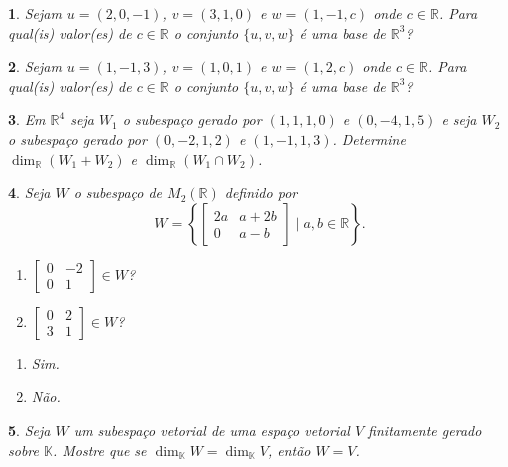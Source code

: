 \documentclass[12pt]{exam}
\newtheorem{exercicio}{}
\newcommand{\real}{\mathbb{R}}
\newcommand{\cp}[1]{\mathbb{#1}}
\begin{document}
\begin{exercicio}
  Sejam $u = (2, 0 , -1)$, $v = (3, 1 , 0)$ e $w = (1, -1 , c)$ onde $c \in \real$. Para qual(is) valor(es) de $c \in \real$ o conjunto $\{u, v, w\}$ \'e uma base de $\real^3$?
\end{exercicio}

\begin{exercicio}
  Sejam $u = (1, -1 , 3)$, $v = (1, 0 , 1)$ e $w = (1, 2 , c)$ onde $c \in \real$. Para qual(is) valor(es) de $c \in \real$ o conjunto $\{u, v, w\}$ \'e uma base de $\real^3$?
\end{exercicio}

\begin{exercicio}
  Em $\real^4$ seja $W_1$ o subespa\c{c}o gerado por $(1,1,1,0)$ e $(0,-4,1,5)$ e seja $W_2$ o subespa\c{c}o gerado por $(0,-2,1,2)$ e $(1,-1,1,3)$. Determine $\dim_\real(W_1 + W_2)$ e $\dim_\real(W_1 \cap W_2)$.
\end{exercicio}

\begin{exercicio}
  Seja $W$ o subespa\c{c}o de $M_2(\real)$ definido por
  \[
    W = \left\{\begin{bmatrix}2a & a + 2b\\0 & a - b\end{bmatrix} \mid a, b \in \real\right\}.
  \]
  \begin{enumerate}[label={\alph*})]
      \item $\begin{bmatrix}0 & -2\\0 & 1\end{bmatrix} \in W$?
      \item $\begin{bmatrix}0 & 2\\3 & 1\end{bmatrix} \in W$?
    \end{enumerate}
  \begin{solucao}
  \begin{enumerate}[label={\alph*})]
      \item Sim.
      \item N\~ao.
    \end{enumerate}
  \end{solucao}
\end{exercicio}

\begin{exercicio}
  Seja $W$ um subespa\c{c}o vetorial de uma espa\c{c}o vetorial $V$ finitamente gerado sobre $\cp{K}$. Mostre que se $\dim_\cp{K}W = \dim_\cp{K}V$, ent\~ao $W = V$.
\end{exercicio}
\end{document}
